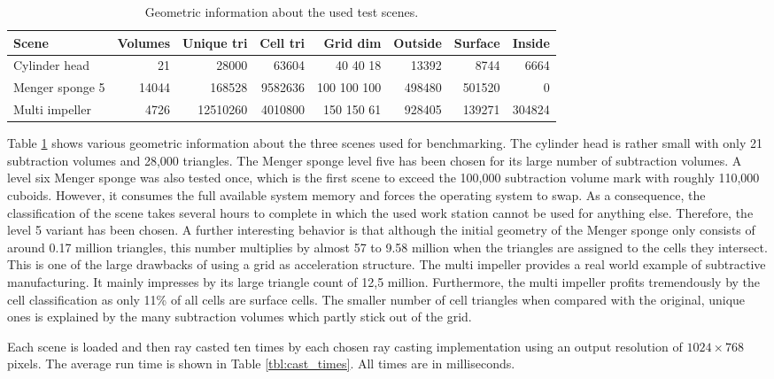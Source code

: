 \begin{table}[h]
	\centering
	\begin{tabular}{|l | r r r r r r r|}
		\hline
		Scene & Volumes & Unique tri & Cell tri & Grid dim & Outside & Surface & Inside \\
		\hline
		Cylinder head & 21 & 28000 & 63604 & 40 40 18 & 13392 & 8744 & 6664 \\
		Menger sponge 5 & 14044 & 168528 & 9582636 & 100 100 100 & 498480 & 501520 & 0 \\
		Multi impeller & 4726 & 12510260 & 4010800 & 150 150 61 & 928405 & 139271 & 304824 \\
		\hline
	\end{tabular}
	\caption{Geometric information about the used test scenes.}
	\label{tbl:geometrics}
\end{table}

Table \ref{tbl:geometrics} shows various geometric information about the three scenes used for benchmarking. The cylinder head is rather small with only 21 subtraction volumes and 28,000 triangles. The Menger sponge level five has been chosen for its large number of subtraction volumes. A level six Menger sponge was also tested once, which is the first scene to exceed the 100,000 subtraction volume mark with roughly 110,000 cuboids. However, it consumes the full available system memory and forces the operating system to swap. As a consequence, the classification of the scene takes several hours to complete in which the used work station cannot be used for anything else. Therefore, the level 5 variant has been chosen. A further interesting behavior is that although the initial geometry of the Menger sponge only consists of around 0.17 million triangles, this number multiplies by almost 57 to 9.58 million when the triangles are assigned to the cells they intersect. This is one of the large drawbacks of using a grid as acceleration structure. The multi impeller provides a real world example of subtractive manufacturing. It mainly impresses by its large triangle count of 12,5 million. Furthermore, the multi impeller profits tremendously by the cell classification as only 11\% of all cells are surface cells. The smaller number of cell triangles when compared with the original, unique ones is explained by the many subtraction volumes which partly stick out of the grid.

Each scene is loaded and then ray casted ten times by each chosen ray casting implementation using an output resolution of $1024 \times 768$ pixels. The average run time is shown in Table \ref{tbl:cast_times}. All times are in milliseconds.

